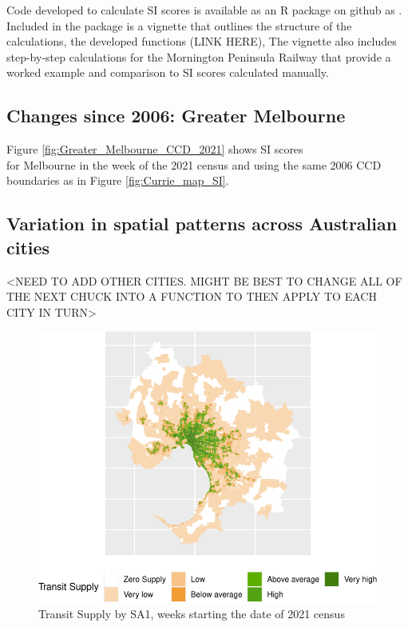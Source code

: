 \documentclass[preprint, 3p,
authoryear]{elsarticle} %
\begin{document}
Code developed to calculate SI scores is available as an R package on
github as \citet{gtfssupplyindex_github}. Included in the package is a
vignette that outlines the structure of the calculations, the developed
functions (LINK HERE), The vignette also includes step-by-step
calculations for the Mornington Peninsula Railway that provide a worked
example and comparison to SI scores calculated manually.

\subsection{Changes since 2006: Greater
Melbourne}\label{changes-since-2006-greater-melbourne-1}

Figure \ref{fig:Greater_Melbourne_CCD_2021} shows SI scores\\
for Melbourne in the week of the 2021 census and using the same 2006 CCD
boundaries as in Figure \ref{fig:Currie_map_SI}.

\subsection{Variation in spatial patterns across Australian
cities}\label{variation-in-spatial-patterns-across-australian-cities}

\textless NEED TO ADD OTHER CITIES. MIGHT BE BEST TO CHANGE ALL OF THE
NEXT CHUCK INTO A FUNCTION TO THEN APPLY TO EACH CITY IN
TURN\textgreater{}

\begin{figure}
\centering
\includegraphics{Leveraging_GTFS_to_assess_transit_supply_Transport_Geography_files/figure-latex/Australian_cities_2021-1.pdf}
\caption{Transit Supply by SA1, weeks starting the date of 2021 census}
\end{figure}
\end{document}
